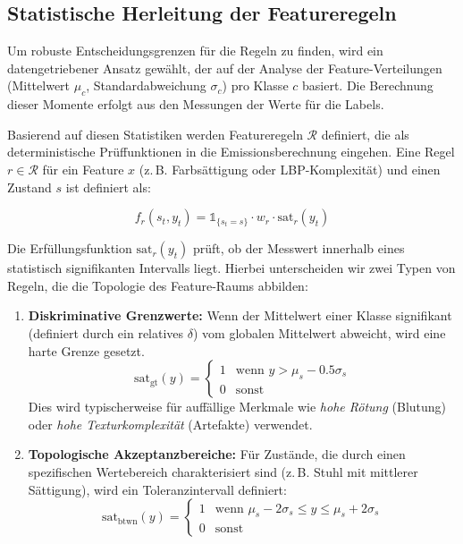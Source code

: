 \subsection{Statistische Herleitung der Featureregeln}
Um robuste Entscheidungsgrenzen für die Regeln zu finden, wird ein datengetriebener Ansatz gewählt, der auf der Analyse der Feature-Verteilungen (Mittelwert $\mu_c$, Standardabweichung $\sigma_c$) pro Klasse $c$ basiert. Die Berechnung dieser Momente erfolgt aus den Messungen der Werte für die Labels.

Basierend auf diesen Statistiken werden Featureregeln $\mathcal{R}$ definiert, die als deterministische Prüffunktionen in die Emissionsberechnung eingehen. Eine Regel $r \in \mathcal{R}$ für ein Feature $x$ (z.\,B. Farbsättigung oder LBP-Komplexität) und einen Zustand $s$ ist definiert als:

\begin{equation}
f_r(s_t, y_t) = \mathbb{1}_{\{s_t = s\}} \cdot w_r \cdot \text{sat}_r(y_t)
\end{equation}

Die Erfüllungsfunktion $\text{sat}_r(y_t)$ prüft, ob der Messwert innerhalb eines statistisch signifikanten Intervalls liegt. Hierbei unterscheiden wir zwei Typen von Regeln, die die Topologie des Feature-Raums abbilden:

\begin{enumerate}
    \item \textbf{Diskriminative Grenzwerte:} Wenn der Mittelwert einer Klasse signifikant (definiert durch ein relatives $\delta$) vom globalen Mittelwert abweicht, wird eine harte Grenze gesetzt.
    \[
    \text{sat}_{\text{gt}}(y) = \begin{cases} 1 & \text{wenn } y > \mu_s - 0.5\sigma_s \\ 0 & \text{sonst} \end{cases}
    \]
    Dies wird typischerweise für auffällige Merkmale wie \textit{hohe Rötung} (Blutung) oder \textit{hohe Texturkomplexität} (Artefakte) verwendet.
    
    \item \textbf{Topologische Akzeptanzbereiche:} Für Zustände, die durch einen spezifischen Wertebereich charakterisiert sind (z.\,B. Stuhl mit mittlerer Sättigung), wird ein Toleranzintervall definiert:
    \[
    \text{sat}_{\text{btwn}}(y) = \begin{cases} 1 & \text{wenn } \mu_s - 2\sigma_s \leq y \leq \mu_s + 2\sigma_s \\ 0 & \text{sonst} \end{cases}
    \]
\end{enumerate}


